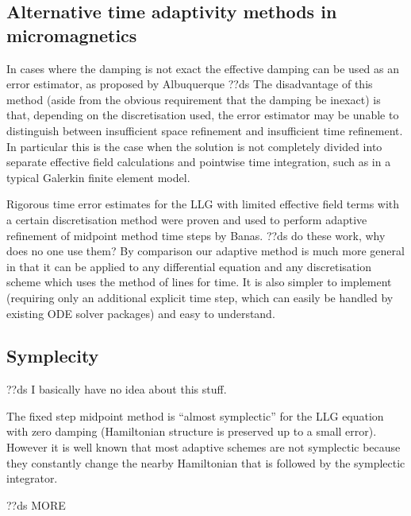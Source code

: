\subsection{Alternative time adaptivity methods in micromagnetics}
\label{sec:altern-time-adapt}

In cases where the damping is not exact the effective damping can be used as an error estimator, as proposed by Albuquerque \etal\cite{Albuquerque2001}
??ds The disadvantage of this method (aside from the obvious requirement that the damping be inexact) is that, depending on the discretisation used, the error estimator may be unable to distinguish between insufficient space refinement and insufficient time refinement.
In particular this is the case when the solution is not completely divided into separate effective field calculations and pointwise time integration, such as in a typical Galerkin finite element model.

Rigorous time error estimates for the LLG with limited effective field terms with a certain discretisation method were proven and used to perform adaptive refinement of midpoint method time steps by Banas.\cite{Banas-thesis}
??ds do these work, why does no one use them?
By comparison our adaptive method is much more general in that it can be applied to any differential equation and any discretisation scheme which uses the method of lines for time.
It is also simpler to implement (requiring only an additional explicit time step, which can easily be handled by existing ODE solver packages) and easy to understand.

\subsection{Symplecity}

??ds I basically have no idea about this stuff.

The fixed step midpoint method is ``almost symplectic'' for the LLG equation with zero damping (Hamiltonian structure is preserved up to a small error).\cite{Austin1993}
However it is well known that most adaptive schemes are not symplectic\cite{Iserles2009} %
because they constantly change the nearby Hamiltonian that is followed by the symplectic integrator.

??ds MORE



